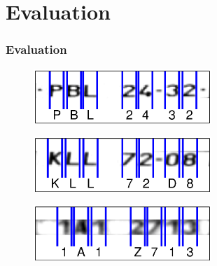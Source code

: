 \documentclass{beamer}
\begin{document}
\section{Evaluation}
\begin{frame}
  \frametitle{Evaluation}

\begin{figure}
  \centering
  \includegraphics[width=0.6\textwidth]{pics/lic_PBL2432.eps}          
\end{figure}  
  
\begin{figure}
  \centering
  \includegraphics[width=0.6\textwidth]{pics/lic_KLL72D8.eps}
\end{figure}  

\begin{figure}
  \centering
  \includegraphics[width=0.6\textwidth]{pics/lic_1A1Z713.eps}
\end{figure}    
  
\end{frame}
\end{document}
